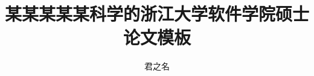 \documentclass[master,oneside]{zjuthesis} %
\title{某某某某某科学的浙江大学软件学院硕士论文模板} %
\author{君之名}
\institute{软件学院}         %
\begin{document}
\maketitle

\abstractmatter



\frontmatter
\tableofcontents %
\listoffigures   %
\listoftables    %
%

\mainmatter



\backmatter



%




\end{document}
